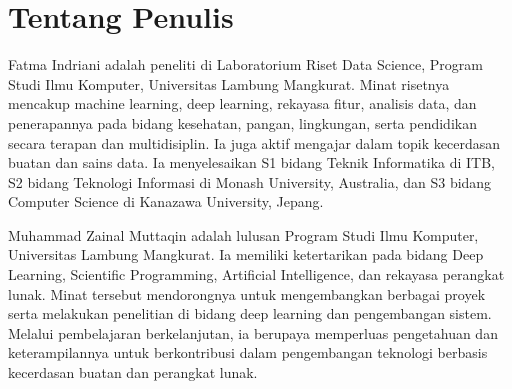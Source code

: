 \chapter*{Tentang Penulis}

\noindent Fatma Indriani adalah peneliti di Laboratorium Riset Data Science, Program Studi Ilmu Komputer, Universitas Lambung Mangkurat. Minat risetnya mencakup machine learning, deep learning, rekayasa fitur, analisis data, dan penerapannya pada bidang kesehatan, pangan, lingkungan, serta pendidikan secara terapan dan multidisiplin. Ia juga aktif mengajar dalam topik kecerdasan buatan dan sains data. Ia menyelesaikan S1 bidang Teknik Informatika di ITB, S2 bidang Teknologi Informasi di Monash University, Australia, dan S3 bidang Computer Science di Kanazawa University, Jepang.\par

\penulisjeda

\noindent Muhammad Zainal Muttaqin adalah lulusan Program Studi Ilmu Komputer, Universitas Lambung Mangkurat. Ia memiliki ketertarikan pada bidang Deep Learning, Scientific Programming, Artificial Intelligence, dan rekayasa perangkat lunak. Minat tersebut mendorongnya untuk mengembangkan berbagai proyek serta melakukan penelitian di bidang deep learning dan pengembangan sistem. Melalui pembelajaran berkelanjutan, ia berupaya memperluas pengetahuan dan keterampilannya untuk berkontribusi dalam pengembangan teknologi berbasis kecerdasan buatan dan perangkat lunak.\par

